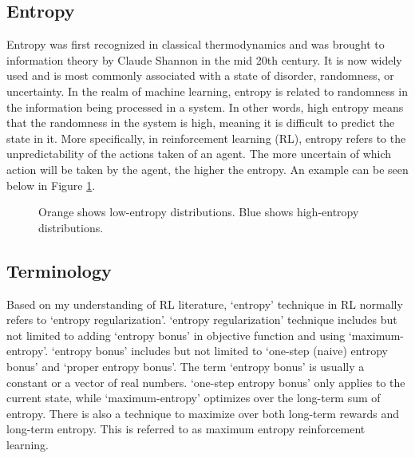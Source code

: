 \documentclass[lang=en,mode=normal,device=normal,color=blue,12pt]{elegantnote}
\DeclareMathOperator*{\1}{\mathbbm{1}}
\begin{document}

\newpage
\begin{appendices}

\section{Entropy}
\label{appendix:entropy}

Entropy was first recognized in classical thermodynamics and was brought to information theory by Claude Shannon in the mid 20th century. It is now widely used and is most commonly associated with a state of disorder, randomness, or uncertainty.
In the realm of machine learning, entropy is related to randomness in the information being processed in a system. In other words, high entropy means that the randomness in the system is high, meaning it is difficult to predict the state in it. More specifically, in reinforcement learning (RL), entropy refers to the unpredictability of the actions taken of an agent. The more uncertain of which action will be taken by the agent, the higher the entropy. An example can be seen below in Figure \ref{fig:entropy}.

\begin{figure}[!htbp]
  \centering
  \hfill
  \caption{Orange shows low-entropy distributions. Blue shows high-entropy distributions.}
  \label{fig:entropy}
\end{figure}



\subsection{Terminology}

Based on my understanding of RL literature, `entropy' technique in RL normally refers to `entropy regularization'. `entropy regularization' technique includes but not limited to adding `entropy bonus' in objective function and using `maximum-entropy'. `entropy bonus' includes but not limited to `one-step (naive) entropy bonus' and `proper entropy bonus'. The term `entropy bonus' is usually a constant or a vector of real numbers. `one-step entropy bonus' only applies to the current state, while `maximum-entropy' optimizes over the long-term sum of entropy. There is also a technique to maximize over both long-term rewards and long-term entropy. This is referred to as maximum entropy reinforcement learning.




\end{appendices}
\end{document}
